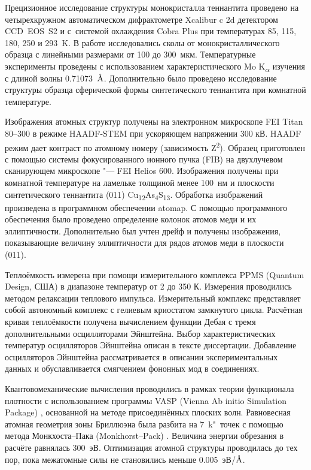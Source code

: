 Прецизионное исследование структуры монокристалла теннантита проведено на четырехкружном автоматическом дифрактометре Xcalibur c 2d детектором  CCD~EOS~S2 и с~системой охлаждения Cobra Plus при температурах 85, 115, 180, 250 и 293~K.
В работе исследовались сколы от монокристаллического образца с линейными размерами от 100 до 300~мкм.
Температурные эксперименты проведены с использованием характеристического Mo K\textsubscript{$\alpha$} изучения с длиной волны 0.71073~$\mbox{\normalfont\AA}$. Дополнительно было проведено исследование структуры образца сферической формы синтетического теннантита при комнатной температуре.

Изображения атомных структур получены на электронном микроскопе FEI Titan 80--300 в режиме HAADF-STEM  при ускоряющем напряжении 300 кВ.
HAADF режим дает контраст по атомному номеру (зависимость Z\textsuperscript{2}).
Образец приготовлен с помощью системы фокусированного ионного пучка (FIB) на двухлучевом сканирующем микроскопе "--- FEI Helios 600.
Изображения получены при комнатной температуре на ламельке толщиной менее 100~нм и плоскости синтетического теннантита (011) Cu\textsubscript{12}As\textsubscript{4}S\textsubscript{13}.
Обработка изображений произведена в программном обеспечении atomap\cite{Nord2017}. С помощью программного обеспечения было проведено определение колонок атомов меди и их эллиптичности. Дополнительно был учтен дрейф и получены изображения, показывающие величину эллиптичности для рядов атомов меди в плоскости (011).

Теплоёмкость измерена при помощи измерительного комплекса PPMS (Quantum Design,
США) в диапазоне температур от 2 до 350 К. Измерения проводились методом релаксации теплового импульса\cite{Hwang_1997}. Измерительный комплекс представляет собой автономный комплекс с гелиевым криостатом замкнутого цикла. Расчётная кривая теплоёмкости получена вычислением функции Дебая с тремя дополнительными осцилляторами Эйнштейна. Выбор характеристических температур осцилляторов Эйнштейна описан в тексте диссертации. Добавление осцилляторов Эйнштейна рассматривается в описании экспериментальных данных и обуславливается смягчением фононных мод в соединениях.

Квантовомеханические вычисления проводились в рамках теории функционала плотности с использованием программы VASP (Vienna Ab initio Simulation Package) \cite{Kresse1993,Kresse1994,Kresse1996}, основанной на методе присоединённых плоских волн. Равновесная атомная геометрия зоны Бриллюэна была разбита  на 7~k"~точек с помощью метода Монкхоста--Пака (Monkhorst--Pack) \cite{Monkhorst_1976}. Величина энергии обрезания в расчёте равнялась 300~эВ. Оптимизация атомной структуры проводилась до тех пор, пока межатомные силы не становились меньше 0.005~эВ/${\mbox{\normalfont\AA}}$.

